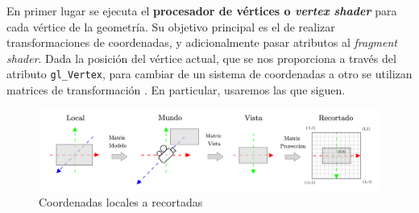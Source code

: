 En primer lugar se ejecuta el \textbf{procesador de vértices o \textit{vertex shader}} para cada vértice de la geometría. Su objetivo principal es el de realizar transformaciones de coordenadas, y adicionalmente pasar atributos al \textit{fragment shader}. Dada la posición del vértice actual, que se nos proporciona a través del atributo \texttt{gl\_Vertex}, para cambiar de un sistema de coordenadas a otro se utilizan matrices de transformación \cite{article:matrices} \cite{article:matrices2}. En particular, usaremos las que siguen.
\begin{figure}[h]
    \centering
    \includegraphics[width=\textwidth]{Plantilla-TFG-master/img/matrices2.png}
    \caption{Coordenadas locales a recortadas}
    \label{fig:matrices}
\end{figure}
